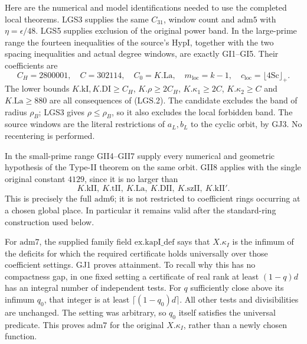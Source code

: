 \documentclass[11pt,a4paper]{article}
\numberwithin{equation}{section}
\theoremstyle{remark}\newtheorem{remark}[theorem]{Remark}
\begin{document}
Here are the numerical and model identifications needed to use
the completed local theorems.  LGS3 supplies the same
\(C_{31}\), window count and \(\mathrm{adm5}\) with
\(\eta=\epsilon/48\).  LGS5 supplies exclusion of the original
power band.  In the large-prime range the fourteen inequalities
of the source's \(\mathrm{HypI}\), together with the two
spacing inequalities and actual degree windows, are exactly
GI1--GI5.  Their coefficients are
\[
 C_H=2800001,\quad C=302114,\quad C_0=K.\mathrm{La},\quad
 m_{\mathrm{loc}}=k-1,\quad c_{\mathrm{loc}}=\lfloor4\mathrm{Sc}\rfloor_+.
                                                               \tag{LGS.20}
\]
The lower bounds \(K.\mathrm{kI},K.\mathrm{DI}\ge C_H\),
\(K.\rho\ge2C_H\), \(K.\kappa_1\ge2C\),
\(K.\kappa_2\ge C\) and \(K.\mathrm{La}\ge880\)
are all consequences of (LGS.2).  The candidate excludes the
band of radius \(\rho_B\); LGS3 gives \(\rho\le\rho_B\),
so it also excludes the local forbidden band.  The source
windows are the literal restrictions of \(a_L,b_L\) to
the cyclic orbit, by GJ3.  No recentering is performed.

In the small-prime range GII4--GII7 supply every numerical
and geometric hypothesis of the Type-II theorem on the same
orbit.  GII8 applies with the single original constant \(4129\),
since it is no larger than
\[
 K.\mathrm{kII},\ K.\mathrm{tII},\ K.\mathrm{La},\
 K.\mathrm{DII},\ K.\mathrm{szII},\ K.\mathrm{kII}'.
\]
This is precisely the full \(\mathrm{adm6}\); it is not
restricted to coefficient rings occurring at a chosen
global place.  In particular it remains valid after the
standard-ring construction used below.

For \(\mathrm{adm7}\), the supplied family field
\(\mathrm{ex.kapI\_\allowbreak def}\) says that \(X.\kappa_I\) is the
infimum of the deficits for which the required certificate
holds universally over those coefficient settings.
GJ1 proves attainment.  To recall why this has no compactness
gap, in one fixed setting a certificate of real rank at least
\((1-q)d\) has an integral number of independent tests.
For \(q\) sufficiently close above its infimum \(q_0\),
that integer is at least \(\lceil(1-q_0)d\rceil\).
All other tests and divisibilities are unchanged.  The
setting was arbitrary, so \(q_0\) itself satisfies the
universal predicate.  This proves \(\mathrm{adm7}\) for the
original \(X.\kappa_I\), rather than a newly chosen function.
\end{document}
